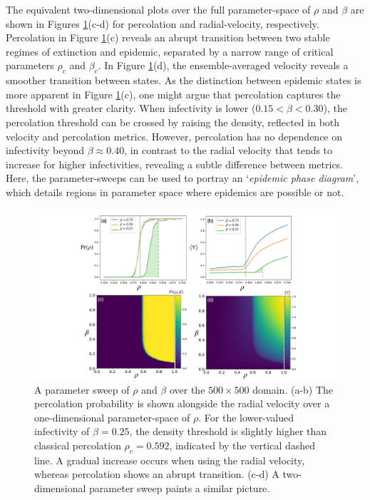 The equivalent two-dimensional plots over the full parameter-space of $\rho$ and $\beta$ are shown in Figures \ref{fig:slm_pspace}(c-d) for percolation and radial-velocity, respectively. 
Percolation in Figure \ref{fig:slm_pspace}(c) reveals an abrupt transition between two stable regimes of extinction and epidemic, separated by a narrow range of critical parameters $\rho_c$ and $\beta_c$.
In Figure \ref{fig:slm_pspace}(d), the ensemble-averaged velocity reveals a smoother transition between states.
As the distinction between epidemic states is more apparent in Figure \ref{fig:slm_pspace}(c), one might argue that percolation captures the threshold with greater clarity.
When infectivity is lower ($0.15 <\beta<0.30$), the percolation threshold can be crossed by raising the density, reflected in both velocity and percolation metrics.
However, percolation has no dependence on infectivity beyond $\beta \approx 0.40$, in contrast to the radial velocity that tends to increase for higher infectivities, revealing a subtle difference between metrics.
Here, the parameter-sweeps can be used to portray an `\textit{epidemic phase diagram}', which details regions in parameter space where epidemics are possible or not.

\begin{figure}
    \centering
    \includegraphics[scale=0.325]{chapter3/figures/figure4-perc-vel-phase-trans.pdf}
    \caption{
    A parameter sweep of $\rho$ and $\beta$ over the $500\times500$ domain. (a-b) The percolation probability is shown alongside the radial velocity over a one-dimensional parameter-space of $\rho$. For the lower-valued infectivity of $\beta=0.25$, the density threshold is slightly higher than classical percolation  $\rho_c=0.592$, indicated by the vertical dashed line. A gradual increase occurs when using the radial velocity, whereas percolation shows an abrupt transition. (c-d) A two-dimensional parameter sweep paints a similar picture.
    }
    \label{fig:slm_pspace}
\end{figure}

